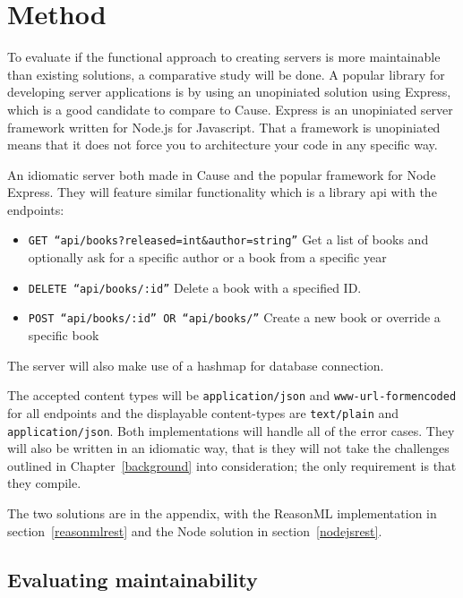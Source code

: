 \chapter{Method}

To evaluate if the functional approach to creating servers is more maintainable
than existing solutions, a comparative study will be done. A popular library
for developing server applications is by using an unopiniated solution using
Express, which is a good candidate to compare to Cause. Express is an
unopiniated server framework written for Node.js for Javascript.  That a
framework is unopiniated means that it does not force you to architecture your
code in any specific way.  

An idiomatic server both made in Cause and the popular framework
for Node Express. They will feature similar functionality which is a library api
with the endpoints:

\begin{itemize}
    \item \texttt{GET ``api/books?released=int\&author=string''} Get a list of
    books and optionally ask for a specific author or a book from a specific
    year
    \item \texttt{DELETE ``api/books/:id''} Delete a book with a specified ID.
    \item \texttt{POST ``api/books/:id'' OR ``api/books/''} Create a new book or
    override a specific book
\end{itemize}

The server will also make use of a hashmap for database connection.

The accepted content types will be \texttt{application/json} and
\texttt{www-url-formencoded} for all endpoints and the displayable content-types
are \texttt{text/plain} and \texttt{application/json}. Both implementations will handle
all of the error cases. They will also be written in an idiomatic way, that is
they will not take the challenges outlined in Chapter~\ref{background} into
consideration; the only requirement is that they compile.

The two solutions are in the appendix, with the ReasonML implementation in
section~\ref{reasonmlrest} and the Node solution in section~\ref{nodejsrest}.

\section{Evaluating maintainability}

